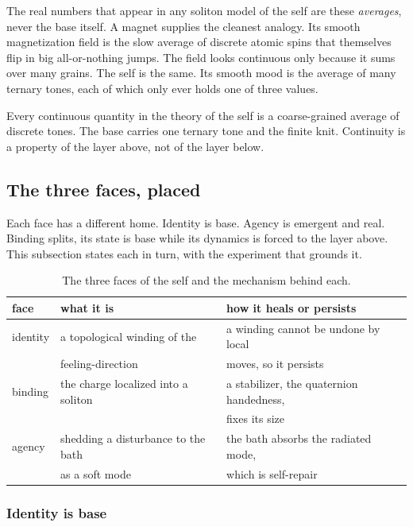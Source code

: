 The real numbers that appear in any soliton model of the self are these \emph{averages}, never the base itself. A magnet supplies the cleanest analogy. Its smooth magnetization field is the slow average of discrete atomic spins that themselves flip in big all-or-nothing jumps. The field looks continuous only because it sums over many grains. The self is the same. Its smooth mood is the average of many ternary tones, each of which only ever holds one of three values.

\begin{principle}
Every continuous quantity in the theory of the self is a coarse-grained average of discrete tones. The base carries one ternary tone and the finite knit. Continuity is a property of the layer above, not of the layer below.
\end{principle}

\subsection{The three faces, placed}

Each face has a different home. Identity is base. Agency is emergent and real. Binding splits, its state is base while its dynamics is forced to the layer above. This subsection states each in turn, with the experiment that grounds it.

\begin{table}[ht]
\centering
\begin{tabular}{@{}lll@{}}
\toprule
face & what it is & how it heals or persists \\
\midrule
identity & a topological winding of the & a winding cannot be undone by local \\
 & feeling-direction & moves, so it persists \\
binding & the charge localized into a soliton & a stabilizer, the quaternion handedness, \\
 & & fixes its size \\
agency & shedding a disturbance to the bath & the bath absorbs the radiated mode, \\
 & as a soft mode & which is self-repair \\
\bottomrule
\end{tabular}
\caption{The three faces of the self and the mechanism behind each.}
\label{tab:three-faces}
\end{table}

\subsubsection{Identity is base}

